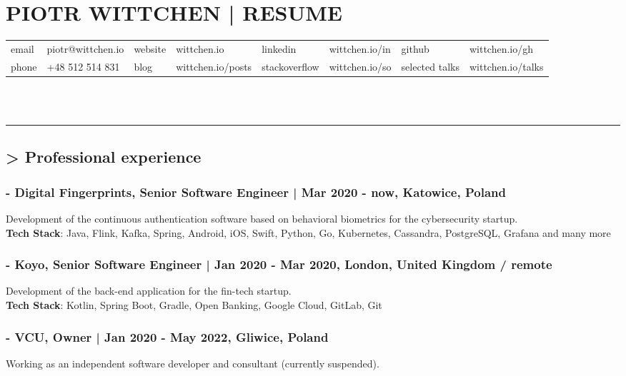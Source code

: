 \documentclass[8pt]{extarticle}
\begin{document}
  \small

  \section*{\large{PIOTR WITTCHEN | RESUME}}

  \begin{tabular}{llllllll}
      email  & piotr@wittchen.io & website  & wittchen.io       & linkedin      & wittchen.io/in & github         & wittchen.io/gh    \\
      phone  & +48 512 514 831   & blog     & wittchen.io/posts & stackoverflow & wittchen.io/so & selected talks & wittchen.io/talks \\
  \end{tabular} \\ \\

    \par\noindent\rule{\textwidth}{0.4pt}

    \subsection*{\normalsize{> Professional experience}}

      \subsubsection*{\normalsize{- Digital Fingerprints, Senior Software Engineer | Mar 2020 - now, Katowice, Poland}}
      Development of the continuous authentication software based on behavioral biometrics for the cybersecurity startup.\\
      \textbf{Tech Stack}: Java, Flink, Kafka, Spring, Android, iOS, Swift, Python, Go, Kubernetes, Cassandra, PostgreSQL, Grafana and many more

      \subsubsection*{\normalsize{- Koyo, Senior Software Engineer | Jan 2020 - Mar 2020, London, United Kingdom / remote}}
      Development of the back-end application for the fin-tech startup.\\
      \textbf{Tech Stack}: Kotlin, Spring Boot, Gradle, Open Banking, Google Cloud, GitLab, Git

      \subsubsection*{\normalsize{- VCU, Owner | Jan 2020 - May 2022, Gliwice, Poland}}
      Working as an independent software developer and consultant (currently suspended).
\end{document}

